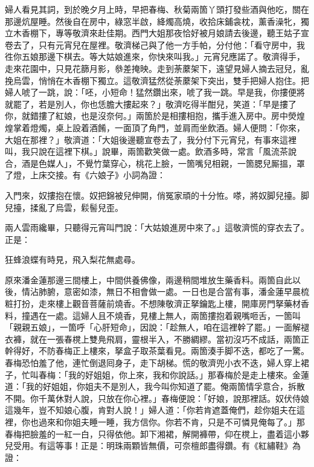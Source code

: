 婦人看見其詞，到於晚夕月上時，早把春梅、秋菊兩箇丫頭打發些酒與他吃，關在那邊炕屋睡。然後自在房中，綠窓半啟，絳燭高燒，收拾床鋪衾枕，薰香澡牝，獨立木香棚下，專等敬濟來赴佳期。西門大姐那夜恰好被月娘請去後邊，聽王姑子宣卷去了，只有元宵兒在屋裡。敬濟梯己與了他一方手帕，分付他：「看守房中，我徃你五娘那邊下棋去。等大姑娘進來，你快來叫我。」元宵兒應諾了。敬濟得手，走來花園中，只見花篩月影，叅差掩映。走到荼䕷架下，遠望見婦人摘去冠兒，亂挽烏雲，悄悄在木香棚下獨立。這敬濟猛然從荼䕷架下突出，雙手把婦人抱住。把婦人唬了一跳，說：「呸，小短命！猛然鑽出來，唬了我一跳。早是我，你摟便將就罷了，若是別人，你也恁膽大摟起來？」敬濟吃得半酣兒，笑道：「早是摟了你，就錯摟了紅娘，也是沒奈何。」{}兩箇於是相摟相抱，攜手進入房中。房中熒煌煌掌着燈燭，桌上設着酒餚，一面頂了角門，並肩而坐飲酒。婦人便問：「你來，大姐在那裡？」敬濟道：「大姐後邊聽宣卷去了，我分付下元宵兒，有事來這裡叫，我只說在這裡下棋。」說畢，兩箇歡笑做一處。飲酒多時，常言「風流茶說合，酒是色媒人」，不覺竹葉穿心，桃花上臉，一箇嘴兒相親，一箇腮兒厮搵，罩了燈，上床交接。有《六娘子》小詞為證：

\begin{myquote}
入門來，奴摟抱在懷。奴把錦被兒伸開，俏冤家頑的十分恠。嗏，將奴脚兒擡。脚兒擡，揉亂了烏雲，鬏髻兒歪。
\end{myquote}

兩人雲雨纔畢，只聽得元宵叫門說：「大姑娘進房中來了。」這敬濟慌的穿衣去了。正是：

\begin{myquote}
狂蜂浪蝶有時見，飛入梨花無處尋。
\end{myquote}

原來潘金蓮那邊三間樓上，中間供養佛像，兩邊稍間堆放生藥香料。兩箇自此以後，情沾肺腑，意密如漆，無日不相會做一處。一日也是合當有事，潘金蓮早晨梳粧打扮，走來樓上觀音菩薩前燒香。不想陳敬濟正拏鑰匙上樓，開庫房門拏藥材香料，撞遇在一處。這婦人且不燒香，{}見樓上無人，兩箇摟抱着親嘴咂舌，一箇叫「親親五娘」，一箇呼「心肝短命」，{}因說：「趁無人，咱在這裡幹了罷。」一面解褪衣褲，就在一張春櫈上雙鳧飛肩，靈根半入，不勝綢繆。當初沒巧不成話，兩箇正幹得好，不防春梅正上樓來，拏盒子取茶葉看見。兩箇湊手脚不迭，都吃了一驚。春梅恐怕羞了他，連忙倒退囘身子，走下胡梯。慌的敬濟兜小衣不迭，婦人穿上裙子，忙叫春梅：「我的好姐姐，你上來，我和你說話。」那春梅於是走上樓來。金蓮道：「我的好姐姐，你姐夫不是別人，我今叫你知道了罷。俺兩箇情孚意合，拆散不開。你千萬休對人說，只放在你心裡。」春梅便說：「好娘，說那裡話。奴伏侍娘這幾年，豈不知娘心腹，肯對人說！」婦人道：「你若肯遮蓋俺們，趁你姐夫在這裡，你也過來和你姐夫睡一睡，我方信你。你若不肯，只是不可憐見俺每了。」那春梅把臉羞的一紅一白，只得依他。卸下湘裙，解開褲帶，仰在櫈上，盡着這小夥兒受用。{}有這等事！正是：明珠兩顆皆無價，可奈檀郎盡得鑽。有《紅繡鞋》為證：

